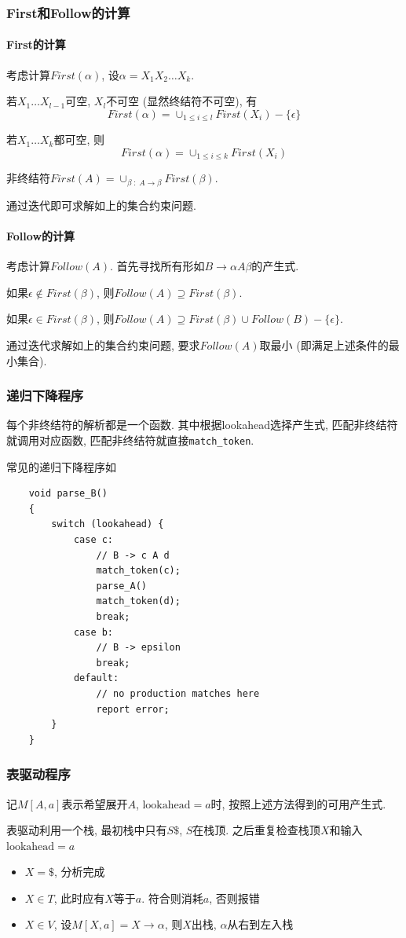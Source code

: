 \documentclass{ctexart}
\begin{document}
\subsubsection{First和Follow的计算}
\paragraph{First的计算} 考虑计算$First(\alpha)$, 设$\alpha = X_1 X_2 \ldots X_k$.\par
    若$X_1\ldots X_{l-1}$可空, $X_l$不可空 (显然终结符不可空), 有\[
        First(\alpha) = \cup_{1 \le i \le l} First(X_i) - \{\epsilon\}\]\par
    若$X_1 \ldots X_k$都可空, 则\[
        First(\alpha) = \cup_{1 \le i \le k} First(X_i)\]\par
    非终结符$First(A) = \cup_{\beta\;:\; A \to \beta} First(\beta)$.\par
    通过迭代即可求解如上的集合约束问题.
\paragraph{Follow的计算} 考虑计算$Follow(A)$. 首先寻找所有形如$B \to \alpha A \beta$的产生式.\par
    如果$\epsilon \not\in First(\beta)$, 则$Follow(A) \supseteq First(\beta)$.\par
    如果$\epsilon \in First(\beta)$, 则$Follow(A) \supseteq First(\beta) \cup Follow(B) - \{\epsilon\}$.\par
    通过迭代求解如上的集合约束问题, 要求$Follow(A)$取最小 (即满足上述条件的最小集合).
\subsubsection{递归下降程序} 每个非终结符的解析都是一个函数.
    其中根据lookahead选择产生式, 匹配非终结符就调用对应函数, 匹配非终结符就直接\texttt{match\_token}.\par
    常见的递归下降程序如\begin{verbatim}
    void parse_B()
    {
        switch (lookahead) {
            case c: 
                // B -> c A d
                match_token(c); 
                parse_A()
                match_token(d);
                break;
            case b: 
                // B -> epsilon
                break;
            default:
                // no production matches here
                report error;
        }
    }\end{verbatim}
\subsubsection{表驱动程序}
    记$M[A, a]$表示希望展开$A$, $\text{lookahead} = a$时, 按照上述方法得到的可用产生式.\par
    表驱动利用一个栈, 最初栈中只有$S\$$, $S$在栈顶. 之后重复检查栈顶$X$和输入$\text{lookahead} = a$ \begin{itemize}
        \item $X = \$$, 分析完成
        \item $X \in T$, 此时应有$X$等于$a$. 符合则消耗$a$, 否则报错
        \item $X \in V$, 设$M[X, a] = X \to \alpha$, 则$X$出栈, $\alpha$从右到左入栈
    \end{itemize}
\end{document}
